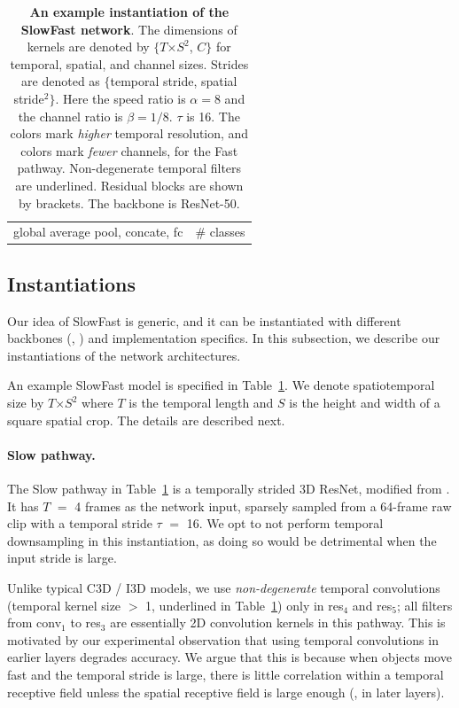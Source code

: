 \documentclass[10pt,twocolumn,letterpaper]{article}
\def\x{$\times$}
\renewcommand{\omega}{\alpha}
\renewcommand{\phi}{\beta}
\begin{document}
\begin{table}[t]
{\begin{tabular}{c|c|c|c}
				&  & \\
				\hline
				\multicolumn{3}{c|}{global average pool, concate, fc}  & \# classes \\
		\end{tabular}}
		\vspace{.5em}
		\caption{\textbf{An example instantiation of the SlowFast network}. 
			The dimensions of kernels are denoted by $\{$$T$\x $S^2$, $C$$\}$ for temporal, spatial, and channel sizes.
			Strides are denoted as $\{$temporal stride, spatial stride$^2$$\}$.
			Here the speed ratio is $\omega=8$ and the channel ratio is $\phi=1/8$. $\tau$ is 16. The  colors mark \emph{higher} temporal resolution, and  colors mark \emph{fewer} channels, for the Fast pathway. 
			Non-degenerate temporal filters are underlined.
			Residual blocks are shown by brackets. The backbone is ResNet-50.
		}
		\label{tab:arch}
	\end{table}
	
	\subsection{Instantiations}  \label{sec:realization}
	
	Our idea of SlowFast is generic, and it can be instantiated with different backbones (\eg, \cite{Simonyan2015,Szegedy2015,He2016}) and implementation specifics. 
	In this subsection, we describe our instantiations of the network architectures.
	
	An example SlowFast model is specified in Table~\ref{tab:arch}.
	We denote spatiotemporal size by $T$\x $S^2$ where $T$ is the temporal length and $S$ is the height and width of a square spatial crop. The details are described next.
	
	\paragraph{Slow pathway.}
	The Slow pathway in Table~\ref{tab:arch} is a temporally strided 3D ResNet, modified from \cite{Feichtenhofer2016a}. It has $T$ $=$ 4 frames as the network input, sparsely sampled from a 64-frame raw clip with a temporal stride $\tau$ $=$ 16. We opt to not perform temporal downsampling in this instantiation, as doing so would be detrimental when the input stride is large.
	
	Unlike typical C3D / I3D models, we use \emph{non-degenerate} temporal convolutions (temporal kernel size $>$ 1, underlined in Table~\ref{tab:arch}) only in res$_4$ and res$_5$; all filters from conv$_1$ to res$_3$ are essentially 2D convolution kernels in this pathway. This is motivated by our experimental observation that using temporal convolutions in earlier layers degrades accuracy. We argue that this is because when objects move fast and the temporal stride is large, there is little correlation within a temporal receptive field unless the spatial receptive field is large enough (\ie, in later layers).
	
\end{document}
